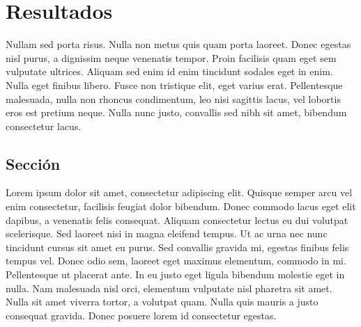 \chapter{Resultados}

Nullam sed porta risus. Nulla non metus quis quam porta laoreet. Donec egestas nisl purus, a dignissim neque venenatis tempor. Proin facilisis quam eget sem vulputate ultrices. Aliquam sed enim id enim tincidunt sodales eget in enim. Nulla eget finibus libero. Fusce non tristique elit, eget varius erat. Pellentesque malesuada, nulla non rhoncus condimentum, leo nisi sagittis lacus, vel lobortis eros est pretium neque. Nulla nunc justo, convallis sed nibh sit amet, bibendum consectetur lacus.

\section{Sección}\label{section}

Lorem ipsum dolor sit amet, consectetur adipiscing elit. Quisque semper arcu vel enim consectetur, facilisis feugiat dolor bibendum. Donec commodo lacus eget elit dapibus, a venenatis felis consequat. Aliquam consectetur lectus eu dui volutpat scelerisque. Sed laoreet nisi in magna eleifend tempus. Ut ac urna nec nunc tincidunt cursus sit amet eu purus. Sed convallis gravida mi, egestas finibus felis tempus vel. Donec odio sem, laoreet eget maximus elementum, commodo in mi. Pellentesque ut placerat ante. In eu justo eget ligula bibendum molestie eget in nulla. Nam malesuada nisl orci, elementum vulputate nisl pharetra sit amet. Nulla sit amet viverra tortor, a volutpat quam. Nulla quis mauris a justo consequat gravida. Donec posuere lorem id consectetur egestas.


